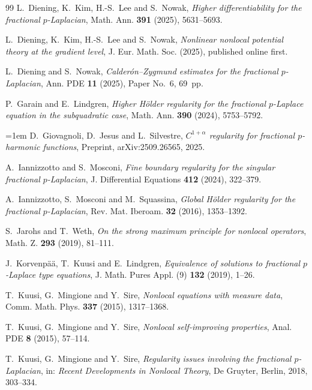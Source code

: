 \documentclass[11pt,reqno]{amsart}
\numberwithin{equation}{section}
\theoremstyle{remark}
\begin{document}
\begin{thebibliography}{99}
L.~Diening, K.~Kim, H.-S.~Lee and S.~Nowak,
\emph{Higher differentiability for the fractional $p$-Laplacian},
Math. Ann. \textbf{391} (2025), 5631--5693.

L.~Diening, K.~Kim, H.-S.~Lee and S.~Nowak,
\emph{Nonlinear nonlocal potential theory at the gradient level},
J. Eur. Math. Soc. (2025), published online first.

L.~Diening and S.~Nowak,
\emph{Calder\'on--Zygmund estimates for the fractional $p$-Laplacian},
Ann. PDE \textbf{11} (2025), Paper No.~6, 69~pp.

P.~Garain and E.~Lindgren,
\emph{Higher H\"older regularity for the fractional $p$-Laplace equation
in the subquadratic case},
Math. Ann. \textbf{390} (2024), 5753--5792.

\begingroup\emergencystretch=1em
D.~Giovagnoli, D.~Jesus and L.~Silvestre,
\emph{$C^{1+\alpha}$ regularity for fractional $p$-harmonic functions},
Preprint, arXiv:2509.26565, 2025.\par
\endgroup

A.~Iannizzotto and S.~Mosconi,
\emph{Fine boundary regularity for the singular fractional $p$-Laplacian},
J. Differential Equations \textbf{412} (2024), 322--379.

A.~Iannizzotto, S.~Mosconi and M.~Squassina,
\emph{Global H\"older regularity for the fractional $p$-Laplacian},
Rev. Mat. Iberoam. \textbf{32} (2016), 1353--1392.

S.~Jarohs and T.~Weth,
\emph{On the strong maximum principle for nonlocal operators},
Math. Z. \textbf{293} (2019), 81--111.

J.~Korvenp\"a\"a, T.~Kuusi and E.~Lindgren,
\emph{Equivalence of solutions to fractional $p$-Laplace type
equations}, J. Math. Pures Appl. (9) \textbf{132} (2019), 1--26.

T.~Kuusi, G.~Mingione and Y.~Sire,
\emph{Nonlocal equations with measure data},
Comm. Math. Phys. \textbf{337} (2015), 1317--1368.

T.~Kuusi, G.~Mingione and Y.~Sire,
\emph{Nonlocal self-improving properties},
Anal. PDE \textbf{8} (2015), 57--114.

T.~Kuusi, G.~Mingione and Y.~Sire,
\emph{Regularity issues involving the fractional $p$-Laplacian},
in: \emph{Recent Developments in Nonlocal Theory},
De Gruyter, Berlin, 2018, 303--334.


\end{thebibliography}
\end{document}
